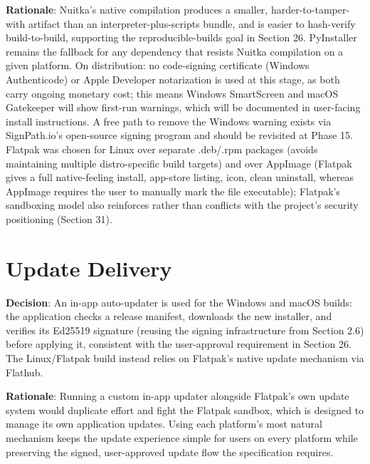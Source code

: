 \textbf{Rationale}:  Nuitka's native compilation produces a smaller, harder-to-tamper-with artifact than an interpreter-plus-scripts bundle, and is easier to hash-verify build-to-build, supporting the reproducible-builds goal in Section 26. PyInstaller remains the fallback for any dependency that resists Nuitka compilation on a given platform. On distribution: no code-signing certificate (Windows Authenticode) or Apple Developer notarization is used at this stage, as both carry ongoing monetary cost; this means Windows SmartScreen and macOS Gatekeeper will show first-run warnings, which will be documented in user-facing install instructions. A free path to remove the Windows warning exists via SignPath.io's open-source signing program and should be revisited at Phase 15. Flatpak was chosen for Linux over separate .deb/.rpm packages (avoids maintaining multiple distro-specific build targets) and over AppImage (Flatpak gives a full native-feeling install, app-store listing, icon, clean uninstall, whereas AppImage requires the user to manually mark the file executable); Flatpak's sandboxing model also reinforces rather than conflicts with the project's security positioning (Section 31).
\section{Update Delivery}
\textbf{Decision}:  An in-app auto-updater is used for the Windows and macOS builds: the application checks a release manifest, downloads the new installer, and verifies its Ed25519 signature (reusing the signing infrastructure from Section 2.6) before applying it, consistent with the user-approval requirement in Section 26. The Linux/Flatpak build instead relies on Flatpak's native update mechanism via Flathub.

\textbf{Rationale}:  Running a custom in-app updater alongside Flatpak's own update system would duplicate effort and fight the Flatpak sandbox, which is designed to manage its own application updates. Using each platform's most natural mechanism keeps the update experience simple for users on every platform while preserving the signed, user-approved update flow the specification requires.

\sentinelchapterend